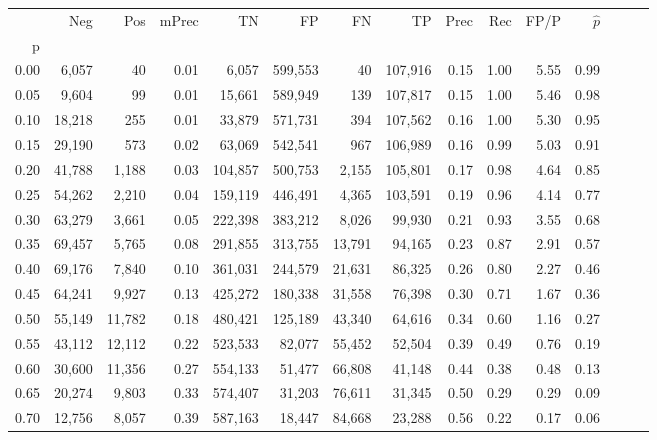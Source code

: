 \begin{tabular}{rrrrrrrrrrrrrrr}
\toprule
{} &     Neg &     Pos & mPrec &       TN &       FP &       FN &       TP &  Prec &   Rec &  FP/P & $\hat{p}$ \\
p    &         &         &       &          &          &          &          &       &       &       &           \\
\midrule
0.00 &   6,057 &      40 &  0.01 &    6,057 &  599,553 &       40 &  107,916 &  0.15 &  1.00 &  5.55 &      0.99 \\
0.05 &   9,604 &      99 &  0.01 &   15,661 &  589,949 &      139 &  107,817 &  0.15 &  1.00 &  5.46 &      0.98 \\
0.10 &  18,218 &     255 &  0.01 &   33,879 &  571,731 &      394 &  107,562 &  0.16 &  1.00 &  5.30 &      0.95 \\
0.15 &  29,190 &     573 &  0.02 &   63,069 &  542,541 &      967 &  106,989 &  0.16 &  0.99 &  5.03 &      0.91 \\
0.20 &  41,788 &   1,188 &  0.03 &  104,857 &  500,753 &    2,155 &  105,801 &  0.17 &  0.98 &  4.64 &      0.85 \\
0.25 &  54,262 &   2,210 &  0.04 &  159,119 &  446,491 &    4,365 &  103,591 &  0.19 &  0.96 &  4.14 &      0.77 \\
0.30 &  63,279 &   3,661 &  0.05 &  222,398 &  383,212 &    8,026 &   99,930 &  0.21 &  0.93 &  3.55 &      0.68 \\
0.35 &  69,457 &   5,765 &  0.08 &  291,855 &  313,755 &   13,791 &   94,165 &  0.23 &  0.87 &  2.91 &      0.57 \\
0.40 &  69,176 &   7,840 &  0.10 &  361,031 &  244,579 &   21,631 &   86,325 &  0.26 &  0.80 &  2.27 &      0.46 \\
0.45 &  64,241 &   9,927 &  0.13 &  425,272 &  180,338 &   31,558 &   76,398 &  0.30 &  0.71 &  1.67 &      0.36 \\
0.50 &  55,149 &  11,782 &  0.18 &  480,421 &  125,189 &   43,340 &   64,616 &  0.34 &  0.60 &  1.16 &      0.27 \\
0.55 &  43,112 &  12,112 &  0.22 &  523,533 &   82,077 &   55,452 &   52,504 &  0.39 &  0.49 &  0.76 &      0.19 \\
0.60 &  30,600 &  11,356 &  0.27 &  554,133 &   51,477 &   66,808 &   41,148 &  0.44 &  0.38 &  0.48 &      0.13 \\
0.65 &  20,274 &   9,803 &  0.33 &  574,407 &   31,203 &   76,611 &   31,345 &  0.50 &  0.29 &  0.29 &      0.09 \\
0.70 &  12,756 &   8,057 &  0.39 &  587,163 &   18,447 &   84,668 &   23,288 &  0.56 &  0.22 &  0.17 &      0.06 \\

\end{tabular}
